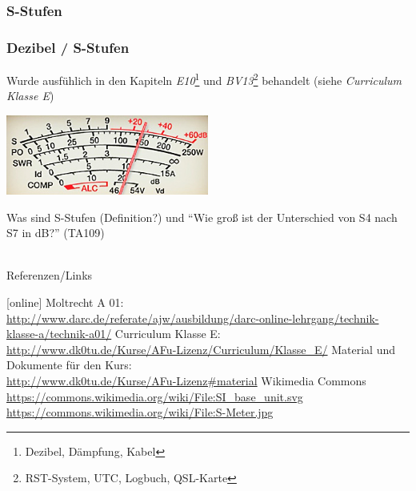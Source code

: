 \subsubsection{S-Stufen}

\begin{frame}
  \frametitle{Dezibel / S-Stufen}

  Wurde ausfühlich in den Kapiteln \emph{E10}\footnote{Dezibel, Dämpfung,
  Kabel} und \emph{BV13}\footnote{RST-System, UTC, Logbuch, QSL-Karte}
  behandelt (siehe \emph{Curriculum Klasse E}\hyperlink{refs}{\cite{curr}})

  \begin{center}
    \includegraphics[width=0.5\textwidth,height=0.2\textheight,keepaspectratio]{e10/S-Meter.jpg}
    \tiny \hyperlink{refs}{\cite{wc}}
  \end{center}


  \begin{exampleblock}{Was sind S-Stufen (Definition?) und ``Wie groß ist der
    Unterschied von S4 nach S7 in dB?'' (TA109)}
  \end{exampleblock}

\end{frame}

\renewcommand{\refname}{Referenzen}

\hypertarget{refs}{}
\textcolor{white}{} \\ %
\Large Referenzen/Links
\footnotesize

\begin{thebibliography}{}
    [online]
   Moltrecht A 01: \\
    \url{http://www.darc.de/referate/ajw/ausbildung/darc-online-lehrgang/technik-klasse-a/technik-a01/}
    Curriculum Klasse E: \\
    \url{http://www.dk0tu.de/Kurse/AFu-Lizenz/Curriculum/Klasse_E/}
     Material und Dokumente für den Kurs: \\
    \url{http://www.dk0tu.de/Kurse/AFu-Lizenz#material}
      Wikimedia Commons \\
    \url{https://commons.wikimedia.org/wiki/File:SI_base_unit.svg}\\
    \url{https://commons.wikimedia.org/wiki/File:S-Meter.jpg}
\end{thebibliography}


